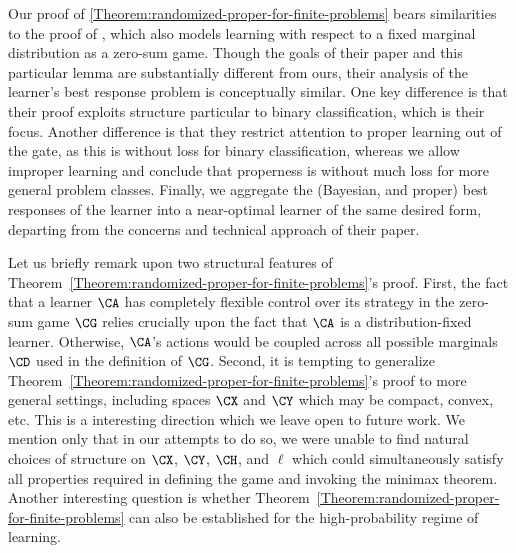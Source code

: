\documentclass[11pt]{article}
\begin{document}
\begin{remark}
Our proof of \cref{Theorem:randomized-proper-for-finite-problems} bears similarities to the proof of \citet[Lemma~5]{darnstadt2011smart}, which also models learning with respect to a fixed marginal distribution as a zero-sum game. Though the goals of their paper and this particular lemma are substantially different from ours, their analysis of the learner's best response problem is conceptually similar. One key difference is that their proof exploits structure particular to binary classification, which is their focus. Another difference is that they restrict attention to proper learning out of the gate, as this is without loss for binary classification, whereas we allow improper learning and conclude that properness is without much loss for more general problem classes. Finally, we aggregate the (Bayesian, and proper) best responses of the learner into a near-optimal learner of the same desired form, departing from the concerns and technical approach of their paper.
\end{remark}

Let us briefly remark upon two structural features of Theorem~\ref{Theorem:randomized-proper-for-finite-problems}'s proof. First, the fact that a learner $\CA$ has completely flexible control over its strategy in the zero-sum game $\CG$ relies crucially upon the fact that $\CA$ is a distribution-fixed learner. Otherwise, $\CA$'s actions would be coupled across all possible marginals $\CD$ used in the definition of $\CG$. Second, it is tempting to generalize Theorem~\ref{Theorem:randomized-proper-for-finite-problems}'s proof to more general settings, including spaces $\CX$ and $\CY$ which may be compact, convex, etc. This is a interesting direction which we leave open to future work. We mention only that in our attempts to do so, we were unable to find natural choices of structure on $\CX$, $\CY$, $\CH$, and $\ell$ which could simultaneously satisfy all properties required in defining the game and invoking the minimax theorem. Another interesting question is whether Theorem~\ref{Theorem:randomized-proper-for-finite-problems} can also be established for the high-probability regime of learning.
\newpage 
\end{document}
